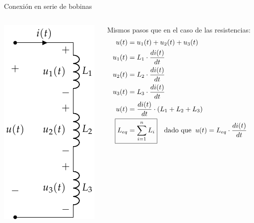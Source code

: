\documentclass[aspectratio=169, xcolor={usenames,svgnames,dvipsnames}]{beamer}
\begin{document}

\begin{frame}{Conexión en serie de bobinas}
    \begin{columns}
    \begin{column}{0.3\columnwidth}
    \begin{center}
    \includegraphics[height=0.85\textheight]{../figs/BobinasSerie.pdf}
    \end{center}
    \end{column}
    \begin{column}{0.7\columnwidth}
    Mismos pasos que en el caso de las resistencias:
    \begin{align*}
      u(t) & = u_1(t) + u_2(t) + u_3(t)\\
      u_1(t) &= L_1 \cdot \frac{di(t)}{dt}\\
      u_2(t) &= L_2 \cdot \frac{di(t)}{dt}\\
      u_3(t) &= L_3 \cdot \frac{di(t)}{dt}\\
      u(t)& = \frac{di(t)}{dt} \cdot (L_1 + L_2 + L_3)\\
      \Aboxed{L_{eq} &= \sum_{i = 1}^n L_i} \quad \textrm{dado que} \;\; u(t) = L_{eq} \cdot \frac{di(t)}{dt}
    \end{align*}
    \end{column}
    \end{columns}
\end{frame}

\end{document}
